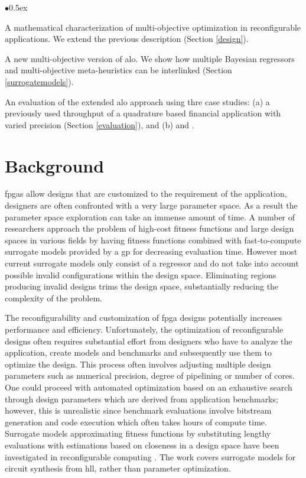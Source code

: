 \documentclass[10pt,conference,a4paper]{IEEEtran}
\begin{document}
\begin{list}{$\bullet$}{\itemsep 0.5ex}

\item A mathematical characterization of multi-objective optimization in reconfigurable applications. We extend the previous description \cite{arc2012MLO} (Section \ref{design}).

\item A new multi-objective version of \ac{alo}. We show how multiple Bayesian regressors and multi-objective meta-heuristics can be interlinked (Section \ref{surrogatemodels}).

\item An evaluation of the extended \ac{alo} approach using thre case studies: (a) a previously used \cite{fpt2012MLO} throughput of a quadrature based financial application with varied precision (Section \ref{evaluation}), and (b) and .
\end{list}


\section{Background}

\acp{fpga} allow designs that are customized to the requirement of the application, designers are often confronted with a very large parameter space. As a result the parameter space exploration can take an immense amount of time. A number of researchers approach the problem of high-cost fitness functions and large design spaces in various fields \cite{1041556,surrogateModel,Su:2008:GPA:1494644.1494688,5194095,LeThi2002258} by having fitness functions combined with fast-to-compute surrogate models provided by a \ac{gp} for decreasing evaluation time. However most current surrogate models only consist of a regressor and do not take into account possible invalid configurations within the design space. Eliminating regions producing invalid designs trims the design space, substantially reducing the complexity of the problem.


The reconfigurability and customization of \ac{fpga} designs potentially increases performance and efficiency. Unfortunately, the optimization of reconfigurable designs often requires substantial effort from designers who have to analyze the application, create models and benchmarks and subsequently use them to optimize the design. This process often involves adjusting multiple design parameters such as numerical precision, degree of pipelining or number of cores. One could proceed with automated optimization based on an exhaustive search through design parameters which are derived from application benchmarks; however, this is unrealistic since benchmark evaluations involve bitstream generation and code execution which often takes hours of compute time. Surrogate models approximating fitness functions by substituting lengthy evaluations with estimations based on closeness in a design space have been investigated in reconfigurable computing \cite{Pilato2008}. The work covers surrogate models for circuit synthesis from \ac{hll}, rather than parameter optimization.
\end{document}
